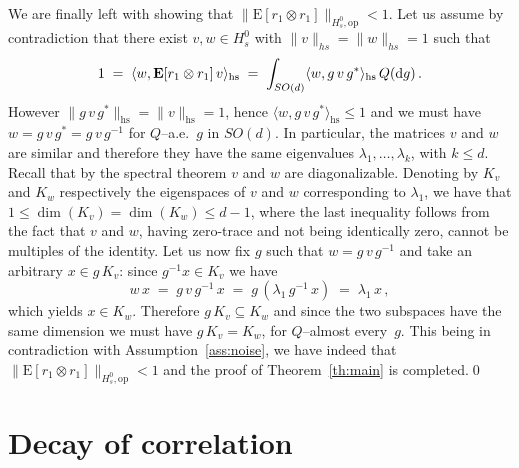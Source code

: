 \documentclass[a4paper,reqno,11pt]{amsart}
\numberwithin{equation}{section}
\newcommand{\gl}{\lambda}
\newcommand{\dd}{\text{\rm d}}             %
\def\bE{\ensuremath{\bs{\mathrm{E}}}}
\def\bs{\boldsymbol}
\begin{document}
We are finally left with showing that $\| \bE [r_1 \otimes r_1]\|_{H_s^0, \text{op}} < 1$.
Let us assume by contradiction that there exist
$v,w \in H_s^0$ with $\|v\|_{hs} = \|w\|_{hs} = 1$ such that
\begin{equation}
	1 \;=\; \langle w, \bE [r_1 \otimes r_1] \, v \rangle_{\text{hs}} \;=\;
	\int_{SO(d)} \langle w, g\, v\, g^* \rangle_{\text{hs}} \, Q(\dd g) \,.
\end{equation}
However $\| g\, v\, g^* \|_{\text{hs}} = \| v \|_{\text{hs}} = 1$,
hence $\langle w, g\, v\, g^* \rangle_{\text{hs}} \le 1$ and
we must have $w = g\, v\, g^* = g\, v\, g^{-1}$ for $Q$--a.e.~$g$ in $SO(d)$.
In particular, the matrices $v$ and $w$ are similar and therefore
they have the same eigenvalues $\gl_1, \ldots, \gl_k$, with $k \le d$.
Recall that by the spectral theorem $v$ and $w$ are diagonalizable.
Denoting by $K_v$ and $K_w$ respectively the eigenspaces of $v$ and $w$
corresponding to $\gl_1$, we have that $1 \le \dim (K_v) = \dim (K_w) \le d-1$,
where the last inequality follows from the fact that $v$ and $w$,
having zero-trace and not being identically zero,
cannot be multiples of the identity.
Let us now fix $g$ such that $w = g\, v\, g^{-1}$ and
take an arbitrary $x \in g \, K_v$: since $g^{-1} x \in K_v$ we have
\begin{equation}
	w\,x \;=\; g \, v \, g^{-1} \, x \;=\; g \, ( \gl_1 \, g^{-1} \, x) \;=\; \gl_1 \, x \,,
\end{equation}
which yields $x \in K_w$. Therefore $g \, K_v \subseteq K_w$ and since
the two subspaces have the same dimension we must have $g \, K_v = K_w$,
for $Q$--almost every~$g$. This being in contradiction with Assumption~\ref{ass:noise},
we have indeed that $\| \bE [r_1 \otimes r_1]\|_{H_s^0, \text{op}} < 1$ and the
proof of Theorem~\ref{th:main} is completed.\qed



\medskip

\section{Decay of correlation}
\label{sec:decay}



\smallskip
\end{document}
